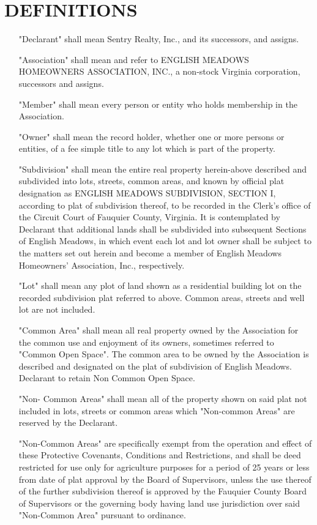 \documentclass[12pt, letterpaper]{article}
\begin{document}
\section{DEFINITIONS}
\begin{itemize}
 \item["Declarant"] shall mean Sentry Realty, Inc., and its successors, and assigns.
 \item["Association"] shall mean and refer to ENGLISH MEADOWS HOMEOWNERS ASSOCIATION, INC., a non-stock Virginia corporation, successors and assigns.
 \item["Member"] shall mean every person or entity who holds membership in the Association.
 \item["Owner"] shall mean the record holder, whether one or more persons or entities, of a fee simple title to any lot which is part of the property.
 \item["Subdivision"] shall mean the entire real property herein-above described and subdivided into lots, streets, common areas, and known by official plat designation as ENGLISH MEADOWS SUBDIVISION, SECTION I, according to plat of subdivision thereof, to be recorded in the Clerk's office of the Circuit Court of Fauquier County, Virginia.
  It is contemplated by Declarant that additional lands shall be subdivided into subsequent Sections of English Meadows, in which event each lot and lot owner shall be subject to the matters set out herein and become a member of English Meadows Homeowners' Association, Inc., respectively.
 \item["Lot"] shall mean any plot of land shown as a residential building lot on the recorded subdivision plat referred to above.
  Common areas, streets and well lot are not included.
 \item["Common Area"] shall mean all real property owned by the Association for the common use and enjoyment of its owners, sometimes referred to "Common Open Space".
  The common area to be owned by the Association is described and designated on the plat of subdivision of English Meadows.
  Declarant to retain Non Common Open Space.

  "Non- Common Areas" shall mean all of the property shown on said plat not included in lots, streets or common areas which "Non-common Areas" are reserved by the Declarant.

  "Non-Common Areas" are specifically exempt from the operation and effect of these Protective Covenants, Conditions and Restrictions, and shall be deed restricted for use only for agriculture purposes for a period of 25 years or less from date of plat approval by the Board of Supervisors, unless the use thereof of the further subdivision thereof is approved by the Fauquier County Board of Supervisors or the governing body having land use jurisdiction over said "Non-Common Area" pursuant to ordinance.
\end{itemize}
\end{document}
